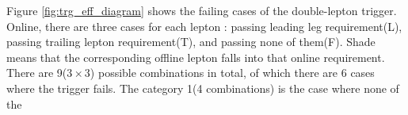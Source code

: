 Figure \ref{fig:trg_eff_diagram} shows the failing cases of the double-lepton trigger. 
Online, there are three cases for each lepton : passing leading leg requirement(L), 
passing trailing lepton requirement(T), and passing none of them(F). 
Shade means that the corresponding offline lepton falls into that online requirement.
There are 9($3\times3$) possible combinations in total, of which there are 6 cases 
where the trigger fails. The category 1(4 combinations) is the case where none of the 
